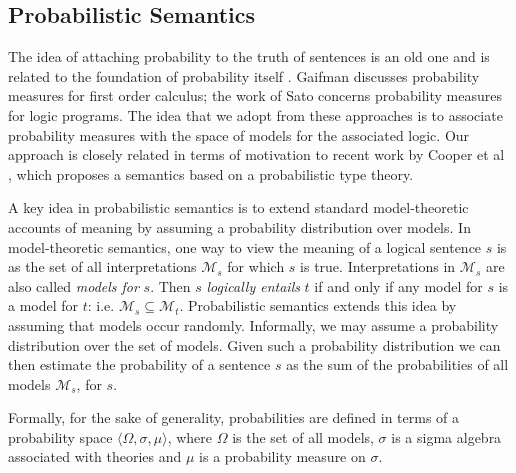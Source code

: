\documentclass[11pt]{article}
\theoremstyle{definition}
\begin{document}
\subsection{Probabilistic Semantics}
 
The idea of attaching probability to the truth of sentences is an old
one and is related to the foundation of probability itself
\cite{Keynes:21,Los:55}. Gaifman \cite{Gaifman:64} discusses probability
measures for first order calculus; the work of Sato \cite{Sato:95}
concerns probability measures for logic programs. The idea that we adopt from these approaches is to associate
probability measures with the space of models for the associated
logic. Our approach is closely related in terms of motivation to recent work by Cooper et al \cite{Cooper:14}, 
which proposes a semantics based on a probabilistic type theory. 


A key idea in probabilistic semantics is to extend standard
model-theoretic accounts of meaning by assuming a probability
distribution over models.  In model-theoretic semantics, one way to
view the meaning of a logical sentence $s$ is as the set of all
interpretations $\mathcal{M}_s$ for which $s$ is true. Interpretations
in $\mathcal{M}_s$ are also called {\em models for\/} $s$. Then $s$
{\em logically entails\/} $t$ if and only if any model for $s$ is a
model for $t$: i.e. $\mathcal{M}_s \subseteq
\mathcal{M}_t$. Probabilistic semantics extends this idea by assuming
that models occur randomly. Informally, we may assume a probability
distribution over the set of models. Given such a probability
distribution we can then estimate the probability of a sentence $s$ as
the sum of the probabilities of all models $\mathcal{M}_s$, for $s$.

Formally, for the sake of generality, probabilities are defined in
terms of a probability space $\langle \Omega, \sigma, \mu\rangle$,
where $\Omega$ is the set of all models, $\sigma$ is a sigma algebra
associated with theories and $\mu$ is a probability measure on
$\sigma$.



\end{document}
